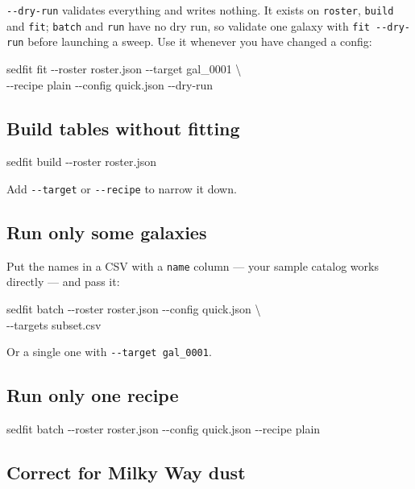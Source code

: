 \documentclass[11pt]{article}
\begin{document}
\texttt{-{}-dry-run} validates everything and writes nothing. It exists
on \texttt{roster}, \texttt{build} and \texttt{fit}; \texttt{batch} and
\texttt{run} have no dry run, so validate one galaxy with \texttt{fit
-{}-dry-run} before launching a sweep. Use it whenever you have changed
a config:

\begin{cmd}\ttfamily
sedfit fit -{}-roster roster.json -{}-target gal\_0001 \textbackslash\\
\hspace*{4em}-{}-recipe plain -{}-config quick.json -{}-dry-run
\end{cmd}

\subsection{Build tables without fitting}

\begin{cmd}\ttfamily
sedfit build -{}-roster roster.json
\end{cmd}

Add \texttt{-{}-target} or \texttt{-{}-recipe} to narrow it down.

\subsection{Run only some galaxies}

Put the names in a CSV with a \texttt{name} column --- your sample
catalog works directly --- and pass it:

\begin{cmd}\ttfamily
sedfit batch -{}-roster roster.json -{}-config quick.json \textbackslash\\
\hspace*{4em}-{}-targets subset.csv
\end{cmd}

Or a single one with \texttt{-{}-target gal\_0001}.

\subsection{Run only one recipe}

\begin{cmd}\ttfamily
sedfit batch -{}-roster roster.json -{}-config quick.json -{}-recipe plain
\end{cmd}

\subsection{Correct for Milky Way dust}
\end{document}
